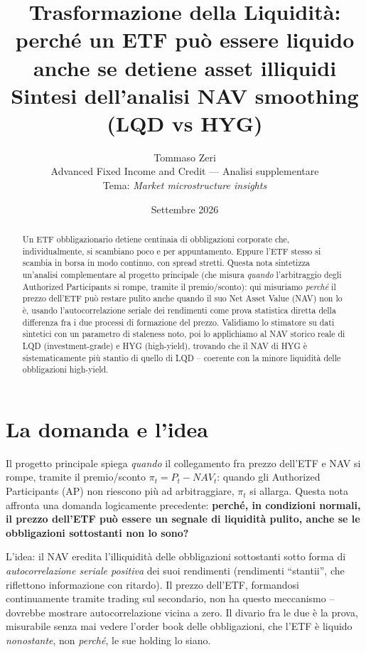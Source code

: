 \documentclass[11pt]{article}
\title{\Large Trasformazione della Liquidit\`a: perch\'e un ETF pu\`o essere liquido\\anche se detiene asset illiquidi\\[4pt]
\large Sintesi dell'analisi NAV smoothing (LQD vs HYG)}
\author{Tommaso Zeri \\ \small Advanced Fixed Income and Credit --- Analisi supplementare \\ \small Tema: \emph{Market microstructure insights}}
\date{Settembre 2026}
\begin{document}
\maketitle

\begin{abstract}
\noindent Un ETF obbligazionario detiene centinaia di obbligazioni corporate che, individualmente, si scambiano poco e per appuntamento. Eppure l'ETF stesso si scambia in borsa in modo continuo, con spread stretti. Questa nota sintetizza un'analisi complementare al progetto principale (che misura \emph{quando} l'arbitraggio degli Authorized Participants si rompe, tramite il premio/sconto): qui misuriamo \emph{perch\'e} il prezzo dell'ETF pu\`o restare pulito anche quando il suo Net Asset Value (NAV) non lo \`e, usando l'autocorrelazione seriale dei rendimenti come prova statistica diretta della differenza fra i due processi di formazione del prezzo. Validiamo lo stimatore su dati sintetici con un parametro di staleness noto, poi lo applichiamo al NAV storico reale di LQD (investment-grade) e HYG (high-yield), trovando che il NAV di HYG \`e sistematicamente pi\`u stantio di quello di LQD -- coerente con la minore liquidit\`a delle obbligazioni high-yield.
\end{abstract}

\section{La domanda e l'idea}

Il progetto principale spiega \emph{quando} il collegamento fra prezzo dell'ETF e NAV si rompe, tramite il premio/sconto $\pi_t = P_t - NAV_t$: quando gli Authorized Participants (AP) non riescono pi\`u ad arbitraggiare, $\pi_t$ si allarga. Questa nota affronta una domanda logicamente precedente: \textbf{perch\'e, in condizioni normali, il prezzo dell'ETF pu\`o essere un segnale di liquidit\`a pulito, anche se le obbligazioni sottostanti non lo sono?}

L'idea: il NAV eredita l'illiquidit\`a delle obbligazioni sottostanti sotto forma di \emph{autocorrelazione seriale positiva} dei suoi rendimenti (rendimenti ``stantii'', che riflettono informazione con ritardo). Il prezzo dell'ETF, formandosi continuamente tramite trading sul secondario, non ha questo meccanismo -- dovrebbe mostrare autocorrelazione vicina a zero. Il divario fra le due \`e la prova, misurabile senza mai vedere l'order book delle obbligazioni, che l'ETF \`e liquido \emph{nonostante}, non \emph{perch\'e}, le sue holding lo siano.
\end{document}
